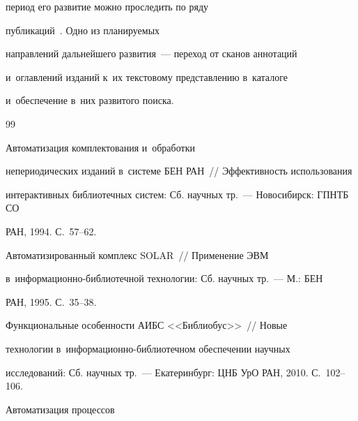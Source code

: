 период его развитие можно проследить по ряду  

пуб\-ли\-ка\-ций~\cite{10-vla, 11-vla, 12-vla}. Одно из планируемых 

направлений дальнейшего развития~--- переход от сканов аннотаций 

и~оглавлений изданий к~их текстовому представлению в~каталоге 

и~обеспечение в~них развитого поиска.



\vspace*{-4pt}

  

 {\small\frenchspacing

{%


\begin{thebibliography}{99}



\vspace*{-2pt}






 Автоматизация комплектования и~обработки 

непериодических изданий в~системе БЕН РАН~/\!\!/ Эффективность использования 

интерактивных библиотечных систем: Сб. научных тр.~--- Новосибирск: ГПНТБ СО 

РАН, 1994. С.~57--62.


 Автоматизированный комплекс SOLAR~/\!\!/ Применение ЭВМ  

в~ин\-фор\-ма\-ци\-он\-но-биб\-лио\-теч\-ной технологии: Сб. научных тр.~--- М.: БЕН 

РАН, 1995. С.~35--38.


 Функциональные особенности АИБС <<Библиобус>>~/\!\!/ Новые 

технологии в~ин\-фор\-ма\-ци\-он\-но-биб\-лио\-теч\-ном обеспечении научных 

исследований: Сб. научных тр.~--- Екатеринбург: ЦНБ УрО РАН, 2010. С.~102--106.


 Автоматизация процессов 


\end{thebibliography}}}
